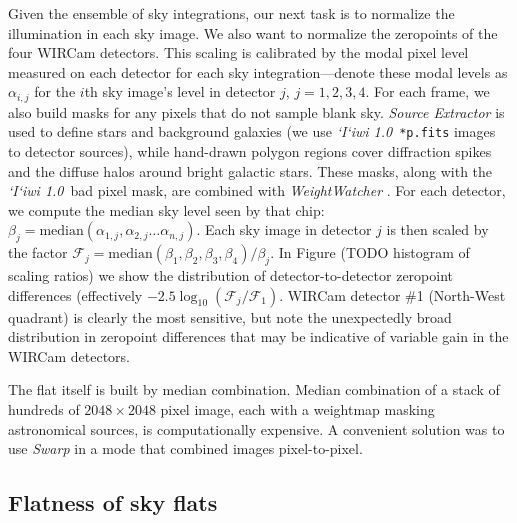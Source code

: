 \documentclass[iop]{emulateapj}
\newcommand{\sw}[1]{\textit{#1}} %
\newcommand{\iiwione}{\sw{`I`iwi 1.0}}
\newcommand{\todo}[1]{\textcolor{RedOrange}{#1}} %
\begin{document}
Given the ensemble of sky integrations, our next task is to normalize the illumination in each sky image.
We also want to normalize the zeropoints of the four WIRCam detectors.
This scaling is calibrated by the modal pixel level measured on each detector for each sky integration---denote these modal levels as $\alpha_{i,j}$ for the $i$th sky image's level in detector $j$, $j=1, 2, 3, 4$.
For each frame, we also build masks for any pixels that do not sample blank sky. \sw{Source Extractor} \citep{Bertin:1996} is used to define stars and background galaxies (we use \iiwione\ \texttt{*p.fits} images to detector sources), while hand-drawn polygon regions cover diffraction spikes and the diffuse halos around bright galactic stars. These masks, along with the \iiwione\ bad pixel mask, are combined with \sw{WeightWatcher} \citep{Marmo:2008}.
For each detector, we compute the median sky level seen by that chip: $\beta_j = \mathrm{median}(\alpha_{1,j}, \alpha_{2,j}\ldots \alpha_{n,j} )$.
Each sky image in detector $j$ is then scaled by the factor $\mathcal{F}_j = \mathrm{median}(\beta_1, \beta_2, \beta_3, \beta_4) / \beta_j$.
In Figure (\todo{TODO histogram of scaling ratios}) we show the distribution of detector-to-detector zeropoint differences (effectively $-2.5 \log_{10}(\mathcal{F}_j / \mathcal{F}_1)$.
WIRCam detector \#1 (North-West quadrant) is clearly the most sensitive, but note the unexpectedly broad distribution in zeropoint differences that may be indicative of variable gain in the WIRCam detectors.

The flat itself is built by median combination. Median combination of a stack of hundreds of $2048\times2048$ pixel image, each with a weightmap masking astronomical sources, is computationally expensive. A convenient solution was to use \sw{Swarp} \citep[an image-mosaicing software package,][]{Bertin:2002} in a mode that combined images pixel-to-pixel.

\subsection{Flatness of sky flats}
\label{sec:skyflatshapes}
\end{document}

